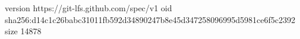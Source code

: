 version https://git-lfs.github.com/spec/v1
oid sha256:d14c1c26babc31011fb592d34890247b8e45d347258096995d5981ce6f5c2392
size 14878
